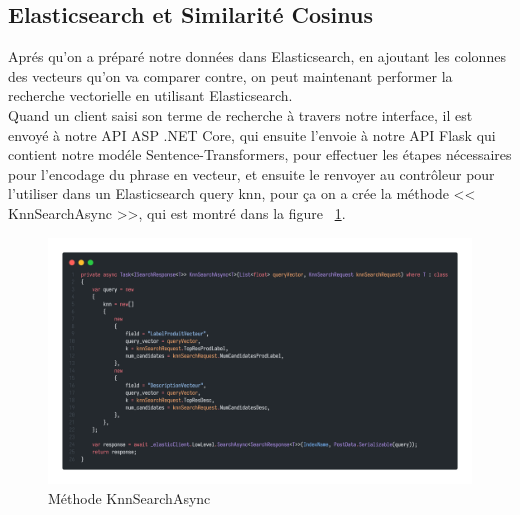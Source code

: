 \subsection{Elasticsearch et Similarité Cosinus}
\noindent
Aprés qu'on a préparé notre données dans Elasticsearch, en ajoutant les colonnes des vecteurs qu'on va comparer contre, on peut maintenant performer la recherche vectorielle en utilisant Elasticsearch. \\
Quand un client saisi son terme de recherche à travers notre interface, il est envoyé à notre API ASP .NET Core, qui ensuite l'envoie à notre API Flask qui contient notre modéle Sentence-Transformers, pour effectuer les étapes nécessaires pour l'encodage du phrase en vecteur, et ensuite le renvoyer au contrôleur pour l'utiliser dans un Elasticsearch query knn, pour ça on a crée la méthode << KnnSearchAsync >>, qui est montré dans la figure ~\ref{fig:knn}.

\begin{figure}[H]
	\centering
	\includegraphics[width=1\textwidth]{logos/knnsearch.png}
	\caption{Méthode KnnSearchAsync}
	\label{fig:knn}
\end{figure}

